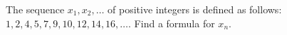 The sequence $x_1, x_2, \ldots$ of positive integers is defined as follows: $1, 2, 4, 5, 7, 9, 10, 12, 14, 16, \ldots$. Find a formula for $x_n$.
